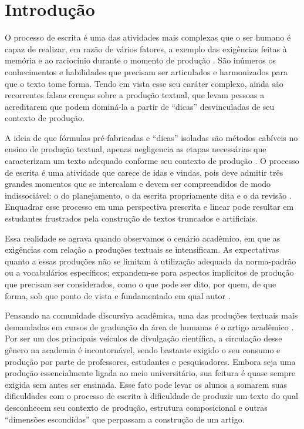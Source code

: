 \section{Introdução}\label{sec-intro}

O processo de escrita é uma das atividades mais complexas que o ser
humano é capaz de realizar, em razão de vários fatores, a exemplo das
exigências feitas à memória e ao raciocínio durante o momento de
produção \cite{garcez2020}. São inúmeros os conhecimentos e habilidades que
precisam ser articulados e harmonizados para que o texto tome forma.
Tendo em vista esse seu caráter complexo, ainda são recorrentes falsas
crenças sobre a produção textual, que levam pessoas a acreditarem que
podem dominá-la a partir de ``dicas'' desvinculadas de seu contexto de
produção.

A ideia de que fórmulas pré-fabricadas e ``dicas'' isoladas são métodos
cabíveis no ensino de produção textual, apenas negligencia as etapas
necessárias que caracterizam um texto adequado conforme seu contexto de
produção \cite{garcez2020}. O processo de escrita é uma atividade que
carece de idas e vindas, pois deve admitir três grandes momentos que se
intercalam e devem ser compreendidos de modo indissociável: o do
planejamento, o da escrita propriamente dita e o da revisão \cite{antunes2005}. Enquadrar esse processo em uma perspectiva prescrita e linear
pode resultar em estudantes frustrados pela construção de textos
truncados e artificiais.

Essa realidade se agrava quando observamos o cenário acadêmico, em que
as exigências com relação a produções textuais se intensificam. As
expectativas quanto a essas produções não se limitam à utilização
adequada da norma-padrão ou a vocabulários específicos; expandem-se para
aspectos implícitos de produção que precisam ser considerados, como o
que pode ser dito, por quem, de que forma, sob que ponto de vista e
fundamentado em qual autor \cite{oliveira2024}.

Pensando na comunidade discursiva acadêmica, uma das produções textuais
mais demandadas em cursos de graduação da área de humanas é o artigo
acadêmico \cite{motta-roth2010}. Por ser um dos principais
veículos de divulgação científica, a circulação desse gênero na academia
é incontornável, sendo bastante exigido o seu consumo e produção por
parte de professores, estudantes e pesquisadores. Embora seja uma
produção essencialmente ligada ao meio universitário, sua feitura é
quase sempre exigida sem antes ser ensinada. Esse fato pode levar os
alunos a somarem suas dificuldades com o processo de escrita à
dificuldade de produzir um texto do qual desconhecem seu contexto de
produção, estrutura composicional e outras ``dimensões escondidas''
\cite{street2010} que perpassam a construção de um artigo.

